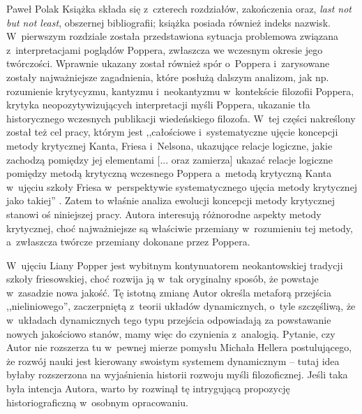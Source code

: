 \begin{newrevplenv}{Paweł Polak}
Książka składa się z~czterech rozdziałów, zakończenia oraz, \textit{last not but not least}, obszernej bibliografii; książka posiada również indeks nazwisk. W~pierwszym rozdziale została przedstawiona sytuacja problemowa związana z~interpretacjami poglądów Poppera, zwłaszcza we wczesnym okresie jego twórczości. Wprawnie ukazany został również spór o~Poppera i~zarysowane zostały najważniejsze zagadnienia, które posłużą dalszym analizom, jak np. rozumienie krytycyzmu, kantyzmu i~neokantyzmu w~kontekście filozofii Poppera, krytyka neopozytywizujących interpretacji myśli Poppera, ukazanie tła historycznego wczesnych publikacji wiedeńskiego filozofa. W~tej części nakreślony został też cel pracy, którym jest ,,całościowe i~systematyczne ujęcie koncepcji metody krytycznej Kanta, Friesa i~Nelsona, ukazujące relacje logiczne, jakie zachodzą pomiędzy jej elementami [... oraz zamierza] ukazać relacje logiczne pomiędzy metodą krytyczną wczesnego Poppera a~metodą krytyczną Kanta w~ujęciu szkoły Friesa w~perspektywie systematycznego ujęcia metody krytycznej jako takiej''
\parencite[][s.~35]{liana_filozoficzne_2021}. %
 Zatem to właśnie analiza ewolucji koncepcji metody krytycznej stanowi oś niniejszej pracy. Autora interesują różnorodne aspekty metody krytycznej, choć najważniejsze są właściwie przemiany w~rozumieniu tej metody, a~zwłaszcza twórcze przemiany dokonane przez Poppera.

W~ujęciu Liany Popper jest wybitnym kontynuatorem neokantowskiej tradycji szkoły friesowskiej, choć rozwija ją w~tak oryginalny sposób, że powstaje w~zasadzie nowa jakość. Tę istotną zmianę Autor określa metaforą przejścia ,,nieliniowego'', zaczerpniętą z~teorii układów dynamicznych, o~tyle szczęśliwą, że w~układach dynamicznych tego typu przejścia odpowiadają za powstawanie nowych jakościowo stanów, mamy więc do czynienia z~analogią. Pytanie, czy Autor nie rozszerza tu w~pewnej mierze pomysłu Michała Hellera postulującego, że rozwój nauki jest kierowany swoistym systemem dynamicznym
\parencites[zob.][]{polak_nieprzewidywalnosc_2008}[][]{polak_dynamika_2004} %
 -- tutaj idea byłaby rozszerzona na wyjaśnienia historii rozwoju myśli filozoficznej. Jeśli taka była intencja Autora, warto by rozwinął tę intrygującą propozycję historiograficzną w~osobnym opracowaniu.


\end{newrevplenv}
